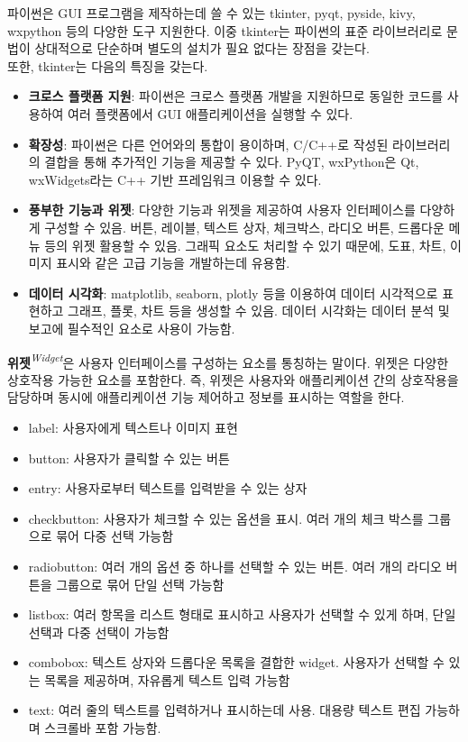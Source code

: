 파이썬은 GUI 프로그램을 제작하는데 쓸 수 있는 tkinter, pyqt, pyside, kivy, wxpython 등의 다양한 도구 지원한다. 이중 tkinter는 파이썬의 표준 라이브러리로 문법이 상대적으로 단순하며 별도의 설치가 필요 없다는 장점을 갖는다.\\
또한, tkinter는 다음의 특징을 갖는다.
\begin{itemize}
\item \textbf{크로스 플랫폼 지원}: 파이썬은 크로스 플랫폼 개발을 지원하므로 동일한 코드를 사용하여 여러 플랫폼에서 GUI 애플리케이션을 실행할 수 있다.
\item \textbf{확장성}: 파이썬은 다른 언어와의 통합이 용이하며, C/C++로 작성된 라이브러리의 결합을 통해 추가적인 기능을 제공할 수 있다. PyQT, wxPython은 Qt, wxWidgets라는 C++ 기반 프레임워크 이용할 수 있다.
\item \textbf{풍부한 기능과 위젯}: 다양한 기능과 위젯을 제공하여 사용자 인터페이스를 다양하게 구성할 수 있음. 버튼, 레이블, 텍스트 상자, 체크박스, 라디오 버튼, 드롭다운 메뉴 등의 위젯 활용할 수 있음. 그래픽 요소도 처리할 수 있기 때문에, 도표, 차트, 이미지 표시와 같은 고급 기능을 개발하는데 유용함.
\item \textbf{데이터 시각화}: matplotlib, seaborn, plotly 등을 이용하여 데이터 시각적으로 표현하고 그래프, 플롯, 차트 등을 생성할 수 있음. 데이터 시각화는 데이터 분석 및 보고에 필수적인 요소로 사용이 가능함.
\end{itemize}

\textbf{위젯}\textit{\textsuperscript{Widget}}은 사용자 인터페이스를 구성하는 요소를 통칭하는 말이다. 위젯은 다양한 상호작용 가능한 요소를 포함한다. 즉, 위젯은 사용자와 애플리케이션 간의 상호작용을 담당하며 동시에 애플리케이션 기능 제어하고 정보를 표시하는 역할을 한다.
\begin{itemize}
\item label: 사용자에게 텍스트나 이미지 표현
\item button: 사용자가 클릭할 수 있는 버튼
\item entry: 사용자로부터 텍스트를 입력받을 수 있는 상자
\item checkbutton: 사용자가 체크할 수 있는 옵션을 표시. 여러 개의 체크 박스를 그룹으로 묶어 다중 선택 가능함
\item radiobutton: 여러 개의 옵션 중 하나를 선택할 수 있는 버튼. 여러 개의 라디오 버튼을 그룹으로 묶어 단일 선택 가능함
\item listbox: 여러 항목을 리스트 형태로 표시하고 사용자가 선택할 수 있게 하며, 단일 선택과 다중 선택이 가능함
\item combobox: 텍스트 상자와 드롭다운 목록을 결합한 widget. 사용자가 선택할 수 있는 목록을 제공하며, 자유롭게 텍스트 입력 가능함
\item text: 여러 줄의 텍스트를 입력하거나 표시하는데 사용. 대용량 텍스트 편집 가능하며 스크롤바 포함 가능함.
\end{itemize}

